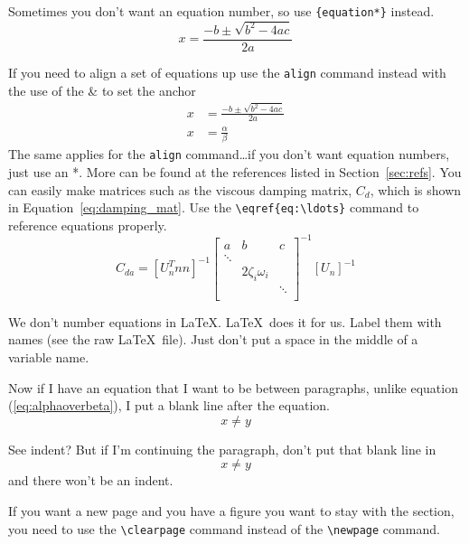 \documentclass[12pt]{report}
\begin{document}
Sometimes you don't want an equation  number, so use \verb'{equation*}' instead.
\begin{equation*}
x=\frac{-b\pm\sqrt{b^2-4ac}}{2a}
\end{equation*}

If you need to align a set of equations up use the \verb'align' command instead with the use of the \& to set the anchor
\begin{align}
x&=\frac{-b\pm\sqrt{b^2-4ac}}{2a}\\
x&=\frac{\alpha}{\beta}
\end{align}
The same applies for the \verb'align' command\ldots if you don\rq{}t want equation numbers,  just use an *.  More can be found at the references listed in Section~\ref{sec:refs}.  You can easily make matrices such as the viscous damping matrix, $C_d$, which is shown in Equation~\eqref{eq:damping_mat}.  Use the \verb'\eqref{eq:\ldots}' command to reference equations properly.
%
\begin{equation}
\label{eq:damping_mat}
C_{da} =[U_n^Tnn]^{-1}
\left[ \begin{array}{ccc}
a&b&c\\
	\ddots & 				& \\
	     	& 2 \zeta_i \omega_i 		& \\
		&				& \ddots \\
\end{array} \right]^{{-1}} [U_n]^{-1}
\end{equation}

We don't number equations in \LaTeX. \LaTeX\ does it for us. Label them with names (see the raw \LaTeX\ file).   Just don't put a space in the middle of a variable name.

Now if I have an equation that I want to be between paragraphs, unlike equation (\ref{eq:alphaoverbeta}), I put a blank line after the equation.
\begin{equation}
  \label{eq:anothersillyequation}
  x\neq y
\end{equation}

See  indent? But if I'm continuing the paragraph, don't put that blank line in
\begin{equation}
  \label{eq:anothersillyequation2}
  x\neq y
\end{equation}
and there won\rq{}t be an indent.

If you want a new page and you have a figure you want to stay with the section, you need to use the \verb'\clearpage' command instead of the \verb'\newpage' command.
\end{document}
